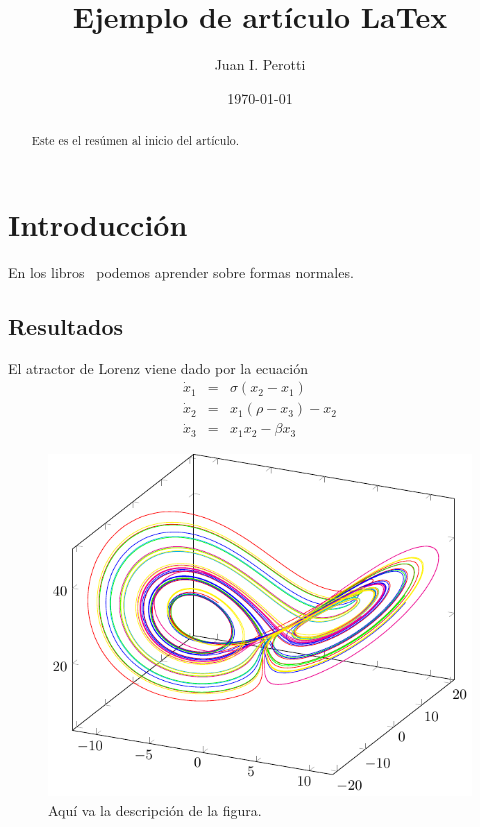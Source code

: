 \documentclass[aps,prl,twocolumn,groupedaddress]{revtex4-2}
\begin{document}
\title{Ejemplo de artículo LaTex}

\author{Juan I. Perotti}

\date{\today}

\begin{abstract}
Este es el resúmen al inicio del artículo.
\end{abstract}

\maketitle

\section{\label{intro}Introducción}

En los libros~\cite{verhulst1985nonlinear,wiggins2003introduction} podemos aprender sobre formas normales.

\subsection{\label{resultados}Resultados}

El atractor de Lorenz viene dado por la ecuación
\begin{eqnarray}
\label{eq1}
\dot{x}_1 &=& \sigma(x_2-x_1) \\
\dot{x}_2 &=& x_1(\rho-x_3)-x_2 \nonumber \\
\dot{x}_3 &=& x_1x_2-\beta x_3 \nonumber
\end{eqnarray}

\begin{figure}
\includegraphics*[scale=.9]{fig1.pdf}
\caption{
\label{fig1}
Aquí va la descripción de la figura.
}
\end{figure}
\end{document}
